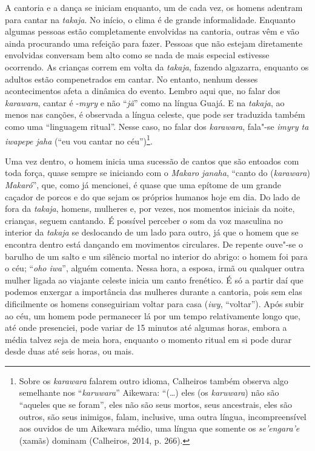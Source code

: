 A cantoria e a dança se iniciam enquanto, um de cada vez, os homens
adentram para cantar na \emph{takaja}. No início, o clima é de grande
informalidade. Enquanto algumas pessoas estão completamente envolvidas
na cantoria, outras vêm e vão ainda procurando uma refeição para fazer.
Pessoas que não estejam diretamente envolvidas conversam bem alto como
se nada de mais especial estivesse ocorrendo. As crianças correm em
volta da \emph{takaja}, fazendo algazarra, enquanto os adultos estão
compenetrados em cantar. No entanto, nenhum desses acontecimentos afeta
a dinâmica do evento. Lembro aqui que, no falar dos \emph{karawara},
cantar é -\emph{myry} e não ``\emph{jã}'' como na língua Guajá. E na
\emph{takaja}, ao menos nas canções, é observada a língua celeste, que
pode ser traduzida também como uma ``linguagem ritual''. Nesse caso, no
falar dos \emph{karawara}, fala"-se \emph{imyry ta iwapepe jaha} (``eu
vou cantar no céu'')\footnote{Sobre os \emph{karawara} falarem outro
  idioma, Calheiros também observa algo semelhante nos
  ``\emph{karuwara}'' Aikewara: ``(\ldots{}) eles (os \emph{karuwara}) não
  são ``aqueles que se foram'', eles não são seus mortos, seus
  ancestrais, eles são outros, são seus inimigos, falam, inclusive, uma
  outra língua, incompreensível aos ouvidos de um Aikewara médio, uma
  língua que somente os \emph{se'engara'e} (xamãs) dominam (Calheiros,
  2014, p. 266).}.

Uma vez dentro, o homem inicia uma sucessão de cantos que são entoados
com toda força, quase sempre se iniciando com o \emph{Makaro janaha},
``canto do (\emph{karawara}) \emph{Makaró}'', que, como já mencionei, é
quase que uma epítome de um grande caçador de porcos e do que sejam os
próprios humanos hoje em dia. Do lado de fora da \emph{takaja}, homens,
mulheres e, por vezes, nos momentos iniciais da noite, crianças, seguem
cantando. É possível perceber o som da voz masculina no interior da
\emph{takaja} se deslocando de um lado para outro, já que o homem que se
encontra dentro está dançando em movimentos circulares. De repente
ouve"-se o barulho de um salto e um silêncio mortal no interior do
abrigo: o homem foi para o céu; ``\emph{oho iwa}'', alguém comenta.
Nessa hora, a esposa, irmã ou qualquer outra mulher ligada ao viajante
celeste inicia um canto frenético. É só a partir daí que podemos
enxergar a importância das mulheres durante a cantoria, pois sem elas
dificilmente os homens conseguiriam voltar para casa (\emph{iwy},
``voltar''). Após subir ao céu, um homem pode permanecer lá por um tempo
relativamente longo que, até onde presenciei, pode variar de 15 minutos
até algumas horas, embora a média talvez seja de meia hora, enquanto o
momento ritual em si pode durar desde duas até seis horas, ou mais.

